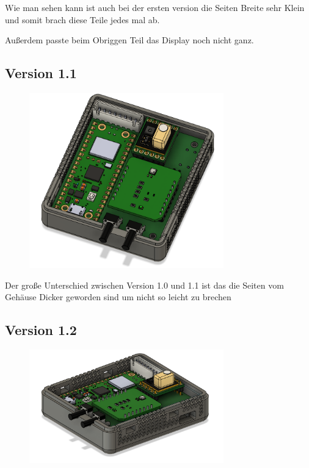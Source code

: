 \begin{inhalt}
Wie man sehen kann ist auch bei der ersten version die Seiten Breite sehr Klein und somit brach diese Teile jedes mal ab. 

Außerdem passte beim Obriggen Teil das Display noch nicht ganz.

\newpage

\subsection{Version 1.1}

\begin{figure}[!htb]
\centering
\includegraphics[width=0.75\textwidth]{files/Thomas/pics/geheause/1.1/gehaeuse_top.png}
\caption[Bildbezeichnung für Abbildungsverzeichnis]{}
\label{fig:gehaeuse_internet_bild}
\end{figure}

Der große Unterschied zwischen Version 1.0 und 1.1 ist das die Seiten vom Gehäuse Dicker geworden sind um nicht so leicht zu brechen

\subsection{Version 1.2}

\begin{figure}[!htb]
\centering
\includegraphics[width=0.75\textwidth]{files/Thomas/pics/geheause/1.2/gehaeuse_side.png}
\caption[Bildbezeichnung für Abbildungsverzeichnis]{}
\label{fig:gehaeuse_internet_bild}
\end{figure}


\end{inhalt}
